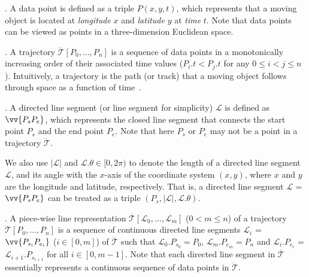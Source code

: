 . A data point is defined as a triple $P(x, y, t)$, which represents that a moving object is located at {\em longitude} $x$ and {\em latitude} $y$ at {\em time} $t$. Note that data points can be viewed as points in a three-dimension Euclidean space.

. A trajectory $\dddot{\mathcal{T}}[P_0, \ldots, P_n]$ is a sequence of data points in a monotonically increasing order of their associated time values (\ie $P_i.t < P_j.t$ for any $0\le i<j\le n$). Intuitively, a trajectory is the path (or track) that a moving object follows through space as a function of time~\cite{physics-trajectory}.

. A directed line segment (or line segment for simplicity) $\mathcal{L}$ is defined as $\vv{P_{s}P_{e}}$, which represents the closed line segment that connects the start point $P_s$ and the end point $P_e$.
Note that here $P_s$ or $P_e$ may not be a point in a trajectory $\dddot{\mathcal{T}}$.


We also use $|\mathcal{L}|$ and $\mathcal{L}.\theta\in [0, 2\pi)$ to denote the length of a directed line segment $\mathcal{L}$, and its angle with the $x$-axis of the coordinate system $(x, y)$, where $x$ and $y$ are the longitude and latitude, respectively.
That is, a directed line segment $\mathcal{L}$ = $\vv{P_{s}P_{e}}$ can be treated as a triple $(P_s, |\mathcal{L}|, \mathcal{L}.\theta)$.

. A piece-wise line representation $\overline{\mathcal{T}}[\mathcal{L}_0, \ldots , \mathcal{L}_m]$ ($0< m \le n$) of a trajectory $\dddot{\mathcal{T}}[P_0, \ldots, P_n]$ is a sequence of continuous directed line segments $\mathcal{L}_{i}$ = $\vv{P_{s_i}P_{e_i}}$ ($i\in[0,m]$) of $\dddot{\mathcal{T}}$  such that $\mathcal{L}_{0}.P_{s_0} = P_0$, $\mathcal{L}_{m}.P_{e_m} = P_n$ and  $\mathcal{L}_{i}.P_{e_i}$ = $\mathcal{L}_{i+1}.P_{s_{i+1}}$ for all $i\in[0, m-1]$. Note that each directed line segment in $\overline{\mathcal{T}}$ essentially represents a continuous sequence of data points in $\dddot{\mathcal{T}}$.



